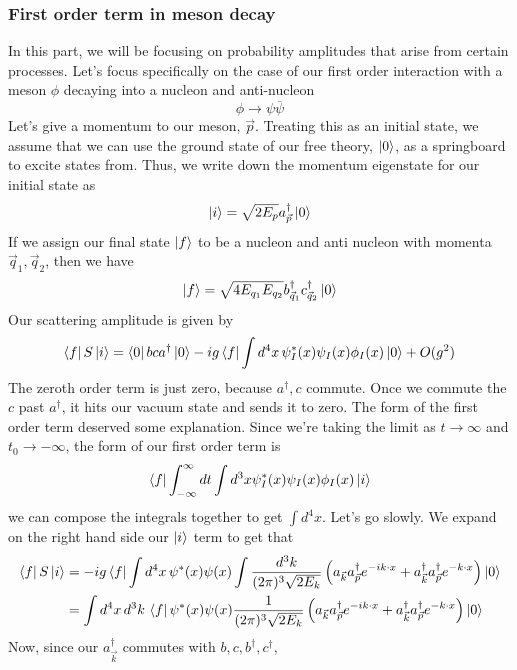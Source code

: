 \subsubsection{First order term in meson decay}
In this part, we will be focusing on probability 
amplitudes that arise from certain processes. 
Let's focus specifically on the case 
of our first order interaction with a meson  $ \phi $ 
decaying into a nucleon and anti-nucleon
\[
\phi \to \psi \overline{ \psi }
\] Let's give a momentum to our meson, $ \vec{p}$. 
Treating this as an initial state, we assume that 
we can use the ground state of our free theory, $ \ket{ 0 } $, 
as a springboard to excite states from. Thus, we write down 
the momentum eigenstate for our initial state as 
\[
\ket{ i } = \sqrt{ 2E_{ p   } } a_{ \vec{p} }^ \dagger \ket{ 0 }  
\] If we assign our final state $ \ket{ f  } $ to be  
a nucleon and anti nucleon with momenta $ \vec{q}_1,  \vec{q}_ 2 $, 
then we have 
\[
\ket{ f  }  = \sqrt{ 4 E_{ q_1 } E_{ q _ 2 } }  b_{ \vec{q}_ 1 }^ \dagger c_{ \vec{q}_ 2 }^\dagger \ket{ 0 } 
\]  
Our scattering amplitude is given by 
\[\bra{ f } S \ket{ i } = \bra{ 0 } bc a ^ \dagger \ket{ 0 } - ig \bra{ f }  \int d^4 x \, \psi_I^* ( x) \psi_I  ( x) \phi_I ( x) \ket{ 0 }  + O ( g ^ 2 ) \] The zeroth order term is just zero, because $ a^ \dagger , c $ commute. 
Once we commute the $c $ past $ a ^ \dagger $, it hits our vacuum 
state and sends it to zero. 
The form of the first order term deserved some explanation. 
Since we're taking the limit as $ t \to \infty $ and $ t_0 \to  - \infty $, 
the form of our first order term is 
\[
\bra{ f} \int_{ - \infty }^\infty dt \int d^ 3 x \psi^ *_ I  ( x) \psi_ I  ( x) \phi_I  ( x)  \ket{ i } 
\] we can compose the integrals together to get $ \int d^4 x $.
Let's go slowly. We expand on the right hand side our $ \ket{ i } $ term 
to get that 
\begin{align*}
\bra { f} S \ket{ i } & = - i g \bra{f} \int d^ 4 x \, \psi ^ * ( x) \psi ( x) \int \frac{ d^ 3 k }{ ( 2 \pi ) ^ 3  \sqrt{ 2 E_{ k  } }  	 } \left(  a_{ \vec{k} } a_{ \vec{p} } ^ \dagger e ^{  - i k \cdot  x } + a_{ \vec{k} } ^ \dagger a_{ \vec{p} } ^ \dagger e^{ - k \cdot  x } \right) \ket{ 0 }  \\
      & =    \int d^ 4 x \, d^ 3 k  \, \bra{f} \psi ^ * ( x) \psi ( x) \frac{ 1 }{ ( 2 \pi ) ^ 3  \sqrt{ 2 E_{ k  } }  	 } \left(  a_{ \vec{k} } a_{ \vec{p} } ^ \dagger e ^{  - i k \cdot  x } + a_{ \vec{k} } ^ \dagger a_{ \vec{p} } ^ \dagger e^{ - k \cdot  x } \right) \ket{ 0 }
\end{align*} Now, since our $ a_{ \vec{k} } ^ \dagger $ commutes with $ b, c, b ^ \dagger, c^ \dagger $, 
